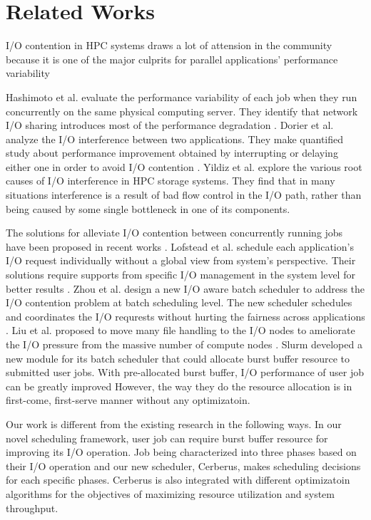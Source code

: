 \section{Related Works}
\label{Sec:RelatedWorks}

I/O contention in HPC systems draws a lot of attension in the community because it is one of the major culprits for parallel applications’ performance variability \cite{hashimoto:ICNC:2012} \cite{dorier:IPDPS:2014} \cite{yildiz:IPDPS:2016}


Hashimoto et al. evaluate the performance variability of each job when they run concurrently on the same physical computing server. They identify that network I/O sharing introduces most of the performance degradation \cite{hashimoto:ICNC:2012}.  
Dorier et al. analyze the I/O interference between two applications. They make quantified study about performance improvement obtained by interrupting or delaying either one in order to avoid I/O contention \cite{dorier:IPDPS:2014}.
Yildiz et al. \cite{yildiz:IPDPS:2016} explore the various root causes of I/O interference in HPC storage systems. They find that in many situations interference is a result of bad flow control in the I/O path, rather than being caused by some single bottleneck in one of its components.

The solutions for alleviate I/O contention between concurrently running jobs have been proposed in recent works \cite{lofstead:sc:2010} \cite{zhou:Cluster:2015} \cite{SlurmBBGuide} \cite{Liu:MSST:2012}.
Lofstead et al. schedule each application’s I/O request individually without a global view from system’s perspective. Their solutions require supports from specific I/O management in the system level for better results \cite{lofstead:sc:2010}. 
Zhou et al. design a new I/O aware batch scheduler to address the I/O contention problem at batch scheduling level. The new scheduler schedules and coordinates the I/O requrests without hurting the fairness across applications \cite{zhou:Cluster:2015}. 
Liu et al. proposed to move many file handling to the I/O nodes to ameliorate the I/O pressure from the massive number of compute nodes \cite{Liu:MSST:2012}.
Slurm developed a new module for its batch scheduler that could allocate burst buffer resource to submitted user jobs. With pre-allocated burst buffer, I/O performance of user job can be greatly improved \cite{SlurmBBGuide} However, the way they do the resource allocation is in first-come, first-serve manner without any optimizatoin. 

Our work is different from the existing research in the following ways. In our novel scheduling framework, user job can require burst buffer resource for improving its I/O operation. Job being characterized into three phases based on their I/O operation and our new scheduler, Cerberus, makes scheduling decisions for each specific phases. Cerberus is also integrated with different optimizatoin algorithms for the objectives of maximizing resource utilization and system throughput.




